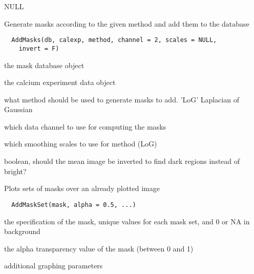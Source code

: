 \documentclass[a4paper]{book}
\begin{document}
%
\begin{Value}
NULL
\end{Value}
%
\begin{Description}\relax
Generate masks according to the given method and add them
to the database
\end{Description}
%
\begin{Usage}
\begin{verbatim}
  AddMasks(db, calexp, method, channel = 2, scales = NULL,
    invert = F)
\end{verbatim}
\end{Usage}
%
\begin{Arguments}
\begin{ldescription}
\item[\code{db}] the mask database object

\item[\code{calexp}] the calcium experiment data object

\item[\code{method}] what method should be used to generate
masks to add. 'LoG' Laplacian of Gaussian

\item[\code{channel}] which data channel to use for computing
the masks

\item[\code{scales}] which smoothing scales to use for method
(LoG)

\item[\code{invert}] boolean, should the mean image be inverted
to find dark regions instead of bright?
\end{ldescription}
\end{Arguments}
%
\begin{Description}\relax
Plots sets of masks over an already plotted image
\end{Description}
%
\begin{Usage}
\begin{verbatim}
  AddMaskSet(mask, alpha = 0.5, ...)
\end{verbatim}
\end{Usage}
%
\begin{Arguments}
\begin{ldescription}
\item[\code{mask}] the specification of the mask, unique values
for each mask set, and 0 or NA in background

\item[\code{alpha}] the alpha transparency value of the mask
(between 0 and 1)

\item[\code{...}] additional graphing parameters
\end{ldescription}
\end{Arguments}
\end{document}
